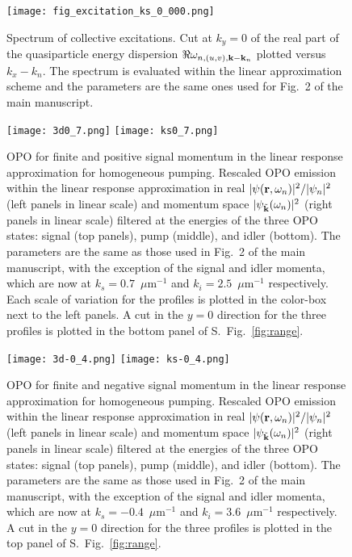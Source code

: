 %
\begin{figure}[tb]\centering
\texttt{[image: fig\_excitation\_ks\_0\_000.png]}
\caption{Spectrum of collective excitations. Cut at $k_y=0$ of the
  real part of the quasiparticle energy dispersion $\Re
  \omega_{n,(u,v),\mathbf{k}-\mathbf{k}_n}$ plotted versus $k_x -
  k_n$. The spectrum is evaluated within the linear approximation
  scheme and the parameters are the same ones used for Fig.~2 of the
  main manuscript.}
\label{fig:bogol}
\end{figure}
%
%
\begin{figure}[tb]
\centering
\texttt{[image: 3d0\_7.png]}
\texttt{[image: ks0\_7.png]}
\caption{OPO for finite and positive signal momentum in
  the linear response approximation for homogeneous pumping. Rescaled
  OPO emission within the linear response approximation in real $|\psi
  (\mathbf{r},\omega_n)|^2/|\psi_n|^2$ (left panels in linear scale) and
  momentum space $|\psi_{\tilde{\mathbf{k}}} (\omega_n)|^2$ (right
  panels in linear scale) filtered at the energies of the three OPO
  states: signal (top panels), pump (middle), and idler (bottom). The
  parameters are the same as those used in Fig.~2 of the main
  manuscript, with the exception of the signal and idler momenta,
  which are now at $k_s = 0.7$~$\mu$m$^{-1}$ and $k_i =
  2.5$~$\mu$m$^{-1}$ respectively. Each scale of variation for the
  profiles is plotted in the color-box next to the left panels. A cut
  in the $y=0$ direction for the three profiles is plotted in the
  bottom panel of S.~Fig.~\ref{fig:range}.}
\label{fig:ksp07}
\end{figure}
%
%
\begin{figure}[tb]
\centering
\texttt{[image: 3d-0\_4.png]}
\texttt{[image: ks-0\_4.png]}
\caption{OPO for finite and negative signal momentum in
  the linear response approximation for homogeneous pumping. Rescaled
  OPO emission within the linear response approximation in real $|\psi
  (\mathbf{r},\omega_n)|^2/|\psi_n|^2$ (left panels in linear scale) and
  momentum space $|\psi_{\tilde{\mathbf{k}}} (\omega_n)|^2$ (right
  panels in linear scale) filtered at the energies of the three OPO
  states: signal (top panels), pump (middle), and idler (bottom). The
  parameters are the same as those used in Fig.~2 of the main
  manuscript, with the exception of the signal and idler momenta,
  which are now at $k_s = -0.4$~$\mu$m$^{-1}$ and $k_i =
  3.6$~$\mu$m$^{-1}$ respectively. A cut in the $y=0$ direction for
  the three profiles is plotted in the top panel of
  S.~Fig.~\ref{fig:range}.}
\label{fig:ksm04}
\end{figure}
